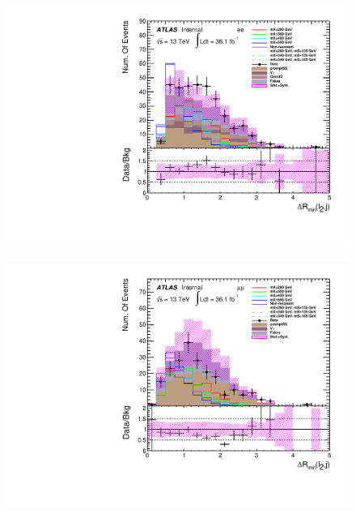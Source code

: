 \begin{figure}[h]
 \begin{minipage}[t]{0.33\linewidth}
 \centering
 \includegraphics[width=1.0\textwidth,angle=-90]{fig/dataMC_high_Njet_CR/mindR_l2j_ee.pdf}\label{fig:dataMC_high_Njet_CR:mindRl2j_ee.pdf}
 \end{minipage}
 \begin{minipage}[t]{0.33\linewidth}
 \centering
 \includegraphics[width=1.0\textwidth,angle=-90]{fig/dataMC_high_Njet_CR/mindR_l2j_mumu.pdf}\label{fig:dataMC_high_Njet_CR:mindRl2j_mumu.pdf}
 \end{minipage}
 \begin{minipage}[t]{0.33\linewidth}
 \centering

\end{minipage}
\end{figure}
